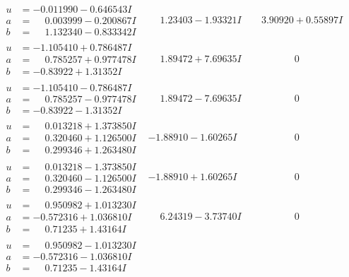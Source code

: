 \documentclass[1p]{elsarticle_modified}
\theoremstyle{definition}
\begin{document}
$$\begin{array}{c|c|c}
\begin{aligned}
u &= -0.011990 - 0.646543 I \\
a &= \phantom{-}0.003999 - 0.200867 I \\
b &= \phantom{-}1.132340 - 0.833342 I\end{aligned}
 & \phantom{-}1.23403 - 1.93321 I & \phantom{-}3.90920 + 0.55897 I \\ \hline\begin{aligned}
u &= -1.105410 + 0.786487 I \\
a &= \phantom{-}0.785257 + 0.977478 I \\
b &= -0.83922 + 1.31352 I\end{aligned}
 & \phantom{-}1.89472 + 7.69635 I & \phantom{-0.000000 } 0 \\ \hline\begin{aligned}
u &= -1.105410 - 0.786487 I \\
a &= \phantom{-}0.785257 - 0.977478 I \\
b &= -0.83922 - 1.31352 I\end{aligned}
 & \phantom{-}1.89472 - 7.69635 I & \phantom{-0.000000 } 0 \\ \hline\begin{aligned}
u &= \phantom{-}0.013218 + 1.373850 I \\
a &= \phantom{-}0.320460 + 1.126500 I \\
b &= \phantom{-}0.299346 + 1.263480 I\end{aligned}
 & -1.88910 - 1.60265 I & \phantom{-0.000000 } 0 \\ \hline\begin{aligned}
u &= \phantom{-}0.013218 - 1.373850 I \\
a &= \phantom{-}0.320460 - 1.126500 I \\
b &= \phantom{-}0.299346 - 1.263480 I\end{aligned}
 & -1.88910 + 1.60265 I & \phantom{-0.000000 } 0 \\ \hline\begin{aligned}
u &= \phantom{-}0.950982 + 1.013230 I \\
a &= -0.572316 + 1.036810 I \\
b &= \phantom{-}0.71235 + 1.43164 I\end{aligned}
 & \phantom{-}6.24319 - 3.73740 I & \phantom{-0.000000 } 0 \\ \hline\begin{aligned}
u &= \phantom{-}0.950982 - 1.013230 I \\
a &= -0.572316 - 1.036810 I \\
b &= \phantom{-}0.71235 - 1.43164 I\end{aligned}

\end{array}$$
\end{document}
